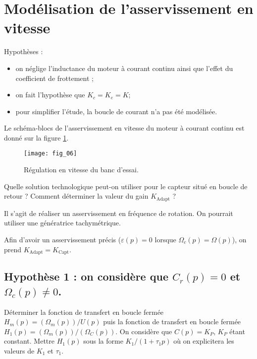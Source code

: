 \section*{Modélisation de l'asservissement en vitesse}

\ifprof
\else

Hypothèses :
\begin{itemize}
\item on néglige l'inductance du moteur à courant continu ainsi que l'effet du coefficient de frottement ;
\item on fait l'hypothèse que $K_c=K_e =K$;
\item pour simplifier l'étude, la boucle de courant n'a pas été modélisée.
\end{itemize}
Le schéma-blocs de l'asservissement en vitesse du moteur à courant continu est donné sur la figure \ref{btp_fig_06}.
 

\begin{figure}[!h]
\texttt{[image: fig\_06]}

\caption{Régulation en vitesse du banc d'essai.}
\label{btp_fig_06}
\end{figure}

\fi


\begin{question}
Quelle solution technologique peut-on utiliser pour le capteur situé en boucle de retour ? Comment déterminer la valeur du gain $K_{\text{Adapt}}$ ?
\end{question}


\ifprof
\begin{corrige}
Il s'agit de réaliser un asservissement en fréquence de rotation. On pourrait utiliser une génératrice tachymétrique. 

Afin d'avoir un asservissement précis ($\varepsilon(p)=0$ lorsque $\Omega_c(p)=\Omega(p)$), on prend $K_{\text{Adapt}}=K_{\text{Capt}}$.
\end{corrige}
\else
\fi


\subsection*{Hypothèse 1 : on considère que $C_r (p)=0$ et $\Omega_c (p)\neq 0$.}
\begin{question}
Déterminer la fonction de transfert en boucle fermée $H_m (p)=(\Omega_m (p))/U(p)$ puis la fonction de transfert en boucle fermée $H_1 (p)=(\Omega_m (p))/(\Omega_C (p))$. On considère que $C(p)=K_P$, $K_P$ étant constant. Mettre $H_1 (p)$ sous la forme $K_1/(1+\tau_1 p)$ où on explicitera les valeurs de $K_1$ et $\tau_1$.
\end{question}

